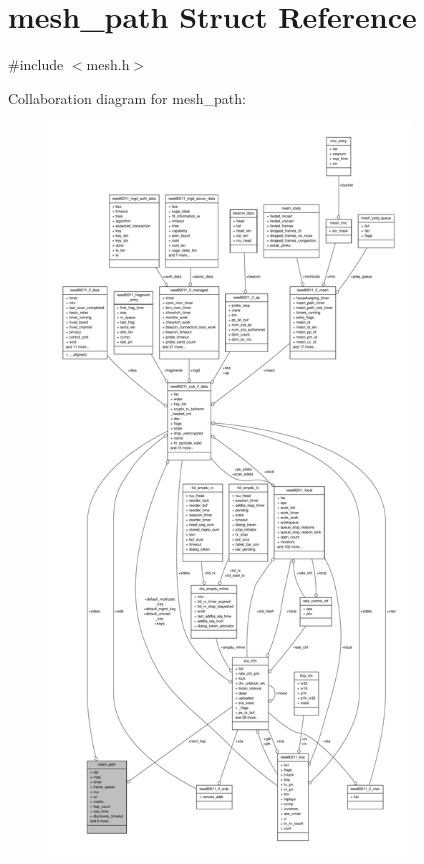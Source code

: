 \hypertarget{structmesh__path}{\section{mesh\-\_\-path Struct Reference}
\label{structmesh__path}
}


{\ttfamily \#include $<$mesh.\-h$>$}



Collaboration diagram for mesh\-\_\-path\-:
\nopagebreak
\begin{figure}[H]
\begin{center}
\leavevmode
\includegraphics[height=550pt]{structmesh__path__coll__graph}
\end{center}
\end{figure}
